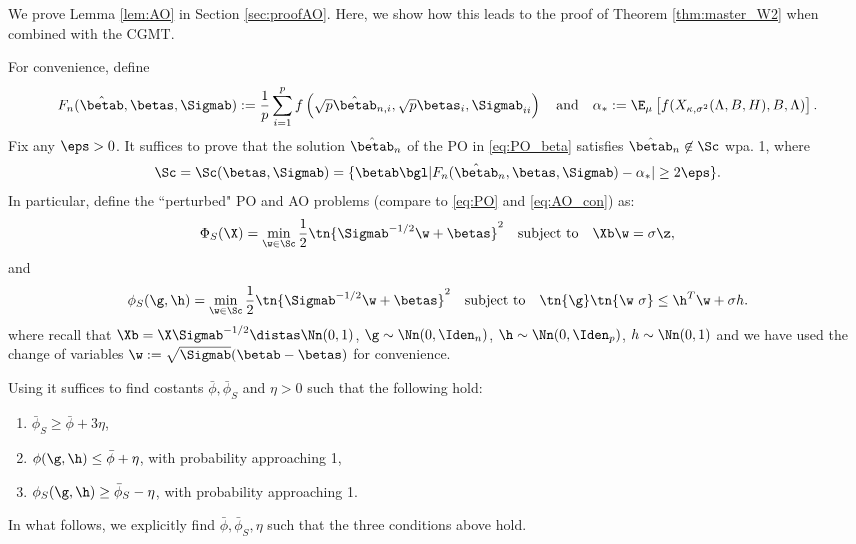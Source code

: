 

We prove Lemma \ref{lem:AO} in Section \ref{sec:proofAO}. Here, we show how this leads to the proof of Theorem \ref{thm:master_W2} when combined with the CGMT.

For convenience, define 
$$F_n(\hat\betab,\betas,\Sigmab):=\frac{1}{p} \sum_{i=1}^{p} f\left(\sqrt{p}\hat\betab_{n,i},\sqrt{p}\betas_{i},\Sigmab_{ii}\right)\quad\text{and}\quad\alpha_*:=\E_\mu\left[f(X_{\kappa,\sigma^2}(\Lambda,B,H),B,\Lambda)\right].$$
Fix  any $\eps>0$. It suffices to prove that the solution $\hat\betab_n$ of the PO in \eqref{eq:PO_beta} satisfies $\hat\betab_n\not\in\Sc$ wpa. 1, where 
\begin{align}\label{eq:S_set}
\Sc = \Sc(\betas,\Sigmab) =\{\betab\bgl |F_n(\hat\betab_n,\betas,\Sigmab)-\alpha_*|\geq 2\eps\}.
\end{align}
In particular, define the ``perturbed" PO and AO problems (compare to \eqref{eq:PO} and \eqref{eq:AO_con}) as:
\begin{align}\label{eq:PO_S}
\Phi_S(\X)=\min_{\w\in\Sc} \frac{1}{2}\tn{\Sigmab^{-1/2}\w+\betas}^2\quad\text{subject to}\quad \Xb\w=\sigma \z,
\end{align}
and
\begin{align}
\phi_S(\g,\h)=\min_{\w\in\Sc} \frac{1}{2}\tn{\Sigmab^{-1/2}\w+\betas}^2\quad\text{subject to}\quad \tn{\g}\tn{\w~{\sigma}}\leq \h^T\w+\sigma h.\label{eq:AO_S}
\end{align}%
where recall that $\Xb=\X\Sigmab^{-1/2}\distas\Nn(0,1)$, $\g\sim\Nn(0,\Iden_n)$, $\h\sim\Nn(0,\Iden_p)$, $h\sim \Nn(0,1)$ and we have used the change of variables $\w:=\sqrt{\Sigmab}(\betab-\betas)$ for convenience. 

 Using \cite[Theorem 6.1(iii)]{thrampoulidis2018precise} it suffices to find costants $\bar\phi, \bar\phi_S$ and $\eta>0$ such that the following hold:
\begin{enumerate}
\item $\bar\phi_S \geq \bar\phi + 3\eta$,
\item $\phi(\g,\h) \leq \bar\phi + \eta$, with probability approaching 1,
\item $\phi_S(\g,\h) \geq \bar\phi_S - \eta$, with probability approaching 1.
\end{enumerate}
In what follows, we  explicitly find $\bar\phi, \bar\phi_S,\eta$ such that the three conditions above hold.

